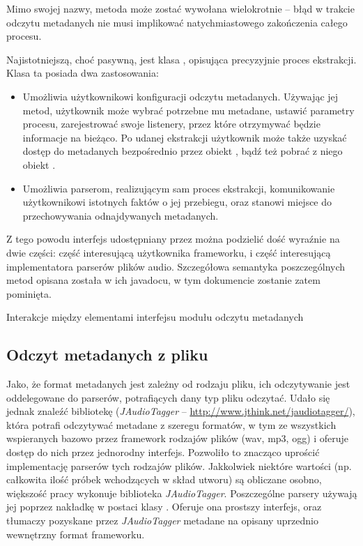 \begin{Note}
Mimo swojej nazwy, metoda  może zostać wywołana wielokrotnie -- błąd w trakcie odczytu
metadanych nie musi implikować natychmiastowego zakończenia całego procesu.
\end{Note}


Najistotniejszą, choć pasywną, jest klasa , opisująca precyzyjnie proces
ekstrakcji. Klasa ta posiada dwa zastosowania:

\begin{itemize}
  \item Umożliwia użytkownikowi konfiguracji odczytu metadanych. Używając jej metod, użytkownik może
    wybrać potrzebne mu metadane, ustawić parametry procesu, zarejestrować swoje listenery, przez
    które otrzymywać będzie informacje na bieżąco. Po udanej ekstrakcji użytkownik może także
    uzyskać dostęp do metadanych bezpośrednio przez obiekt , bądź też pobrać
    z niego obiekt .

  \item Umożliwia parserom, realizującym sam proces ekstrakcji, komunikowanie użytkownikowi
    istotnych faktów o jej przebiegu, oraz stanowi miejsce do przechowywania odnajdywanych
    metadanych.

\end{itemize}

Z tego powodu interfejs udostępniany przez  można podzielić dość wyraźnie na
dwie części: część interesującą użytkownika frameworku, i część interesującą implementatora parserów
plików audio. Szczegółowa semantyka poszczególnych metod opisana została w ich javadocu, w tym
dokumencie zostanie zatem pominięta.

{Interakcje między elementami interfejsu modułu odczytu metadanych}


\subsection{Odczyt metadanych z pliku}
\label{sec:metadane_odczyt}

Jako, że format metadanych jest zależny od rodzaju pliku, ich odczytywanie jest oddelegowane do
parserów, potrafiących dany typ pliku odczytać. Udało się jednak znaleźć bibliotekę
(\emph{JAudioTagger} -- \url{http://www.jthink.net/jaudiotagger/}), która potrafi odczytywać
metadane z szeregu formatów, w tym ze wszystkich wspieranych bazowo przez framework rodzajów plików
(wav, mp3, ogg) i oferuje dostęp do nich przez jednorodny interfejs. Pozwoliło to znacząco uprościć
implementację parserów tych rodzajów plików.  Jakkolwiek niektóre wartości (np. całkowita ilość
próbek wchodzących w skład utworu) są obliczane osobno, większość pracy wykonuje biblioteka
\emph{JAudioTagger}. Poszczególne parsery używają jej poprzez nakładkę w postaci klasy
. Oferuje ona prostszy interfejs, oraz tłumaczy pozyskane przez
\emph{JAudioTagger} metadane na opisany uprzednio wewnętrzny format frameworku.


